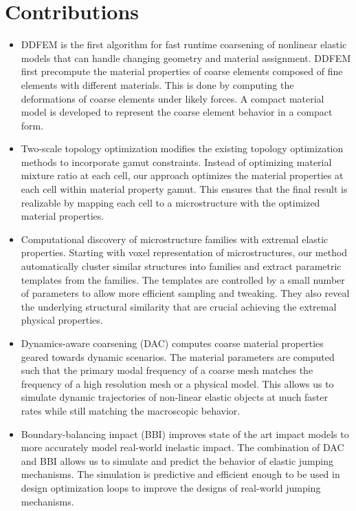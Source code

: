 \section{Contributions}
\begin{itemize}
	\item DDFEM is the first algorithm for fast runtime coarsening of nonlinear elastic models that can handle changing geometry and material assignment.
	DDFEM first precompute the material properties of coarse elements composed of fine elements with different materials.
	This is done by computing the deformations of coarse elements under likely forces.
	A compact material model is developed to represent the coarse element behavior in a compact form.
	\item Two-scale topology optimization modifies the existing topology optimization methods to incorporate gamut constraints.
	Instead of optimizing material mixture ratio at each cell, our approach optimizes the material properties at each cell within material property gamut.
	This ensures that the final result is realizable by mapping each cell to a microstructure with the optimized material properties.
	\item Computational discovery of microstructure families with extremal elastic properties. Starting with voxel representation of microstructures,
	our method automatically cluster similar structures into families and extract parametric templates from the families.
	The templates are controlled by a small number of parameters to allow more efficient sampling and tweaking.
	They also reveal the underlying structural similarity that are crucial achieving the extremal physical properties.	
	\item Dynamics-aware coarsening (DAC) computes coarse material properties geared towards dynamic scenarios. The material parameters are computed such that the primary modal frequency
	of a coarse mesh matches the frequency of a high resolution mesh or a physical model.
	This allows us to simulate dynamic trajectories of non-linear elastic objects at much faster rates while still matching the macroscopic behavior.
	\item Boundary-balancing impact (BBI) improves state of the art impact models to more accurately model real-world inelastic impact.
	The combination of DAC and BBI allows us to simulate and predict the behavior of elastic jumping mechanisms.
	The simulation is predictive and efficient enough to be used in design optimization loops to improve the designs of real-world jumping mechanisms.
\end{itemize}